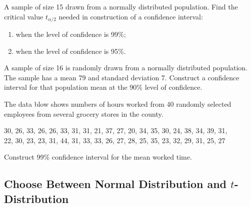 \begin{example}

A sample of size 15 drawn from a normally distributed population. Find
the critical value \(t_{\alpha/2}\) needed in construction of a
confidence interval:

\begin{enumerate}
\item
  when the level of confidence is 99\%;
\item
  when the level of confidence is 95\%.
\end{enumerate}

\end{example}
\vspace*{3\baselineskip}

\begin{example}

A sample of size 16 is randomly drawn from a normally distributed
population. The sample has a mean 79 and standard deviation 7. Construct
a confidence interval for that population mean at the 90\% level of
confidence.

\end{example}
\vspace*{7\baselineskip}

\begin{example}

The data blow shows numbers of hours worked from 40 randomly selected
employees from several grocery stores in the county.

30, 26, 33, 26, 26, 33, 31, 31, 21, 37, 27, 20, 34, 35, 30, 24, 38, 34, 39, 31,\\
22, 30, 23, 23, 31, 44, 31, 33, 33, 26, 27, 28, 25, 35, 23, 32, 29, 31, 25, 27

Construct 99\% confidence interval for the mean worked time.

\end{example}
\vspace*{10\baselineskip}

\hypertarget{choose-between-normal-distribution-and-t-distribution}{%
\subsection{\texorpdfstring{Choose Between Normal Distribution and
\(t\)-Distribution}{Choose Between Normal Distribution and t-Distribution}}\label{choose-between-normal-distribution-and-t-distribution}}

